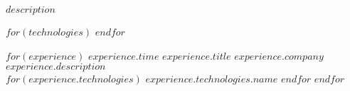 \documentclass[9pt]{developercv} %
\begin{document}
\vspace{0.5cm}



\begin{minipage}[t]{0.4\textwidth} %
	\vspace{-\baselineskip} %
	
    $description$
\end{minipage}
\hfill %
\begin{minipage}[t]{0.5\textwidth} %
	\vspace{-\baselineskip} %
	\begin{barchart}{5.5}
        $for(technologies)$
        $endfor$
	\end{barchart}
\end{minipage}




\begin{entrylist}
    $for(experience)$
        \entry
            {$experience.time$}
            {$experience.title$}
            {$experience.company$}
            {
                $experience.description$ \\
                $for(experience.technologies)$
                    \texttt{$experience.technologies.name$}\slashsep
                $endfor$
            }
    $endfor$
\end{entrylist}
\end{document}
